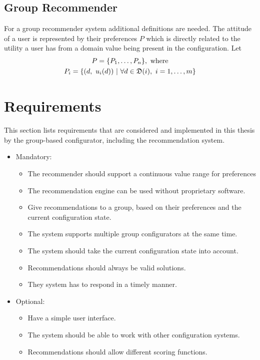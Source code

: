 \subsection{Group Recommender}

For a group recommender system additional definitions are needed. The attitude of a user is represented by their preferences $P$ which is directly related to the utility a user has from a domain value being present in the configuration. Let 
\begin{gather} \label{tab:Foundations:GroupRecommenderSystem:Preferences}
    P = \{ P_1, \dotsc, P_n\},\ \text{where} \\
    P_i = \{(d,\ u_i(d)) \ | \ \forall d \in \mathfrak{D}(i),\ i=1,\dotsc,m \} \notag
\end{gather}


\section{Requirements}
\label{sec:Concept:Requirements}

This section lists requirements that are considered and implemented in this thesis by the group-based configurator, including the recommendation system.

\begin{itemize}
    \item Mandatory:
        \begin{itemize}
            \item The recommender should support a continuous value range for preferences
            \item The recommendation engine can be used without proprietary software.
            \item Give recommendations to a group, based on their preferences and the current configuration state.
            \item The system supports multiple group configurators at the same time.
            \item The system should take the current configuration state into account.

            \item Recommendations should always be valid solutions.
            \item They system has to respond in a timely manner.
        \end{itemize}
    \item Optional:
        \begin{itemize}
            \item Have a simple user interface.
            \item The system should be able to work with other configuration systems.
            \item Recommendations should allow different scoring functions.
        \end{itemize}
\end{itemize}


